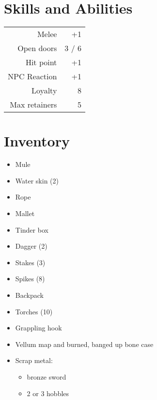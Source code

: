 \documentclass[a4paper]{article}
\begin{document}
\begin{multicols}{2}
\section{Skills and Abilities}
\begin{table}[H]
    \begin{tabular}{r|r} %
      Melee & +1\\
      Open doors & 3 / 6\\
      Hit point & +1\\
      NPC Reaction & +1\\
      Loyalty & 8\\
      Max retainers & 5\\
    \end{tabular}
\end{table}

\columnbreak

\section{Inventory}
\begin{itemize}[nosep, itemindent=1em, label= ]
  \item Mule
  \item Water skin (2)
  \item Rope
  \item Mallet
  \item Tinder box
  \item Dagger (2)
  \item Stakes (3)
  \item Spikes (8)
  \item Backpack
  \item Torches (10)
  \item Grappling hook
  \item Vellum map and burned, banged up bone case
  \item Scrap metal:
    \begin{itemize}[nosep, itemindent=1em, label=-]
      \item bronze sword
      \item 2 or 3 hobbles
  \end{itemize}
\end{itemize}


\end{multicols}
\end{document}
